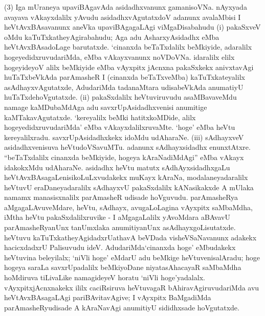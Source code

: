 (3) Iga mUraneya upaviBAgavAda asidadhxvanunx gamanisoVNa. nAyxyada avayava vAkayxdalilx yAvudu asidadhxvAgutatxdoV adanunx avalaMbisi I heVtAvxBAsa\-vanunx aneVka upaviBAgagaLAgi viMgaDisabahudu {\rm(i)} pakaSxveV oMdu kaTuTxkathe\-yAgira\-bahudu; Aga adu AsharxyAsidadhx eMba heVtAvxBAsadoLage barutatxde. `cinanxda beTaTx\-dalilx beMkiyide, adaralilx hogeyedidxruvudariMda, eMba vAkayxvanunx noVDoVNa. idaralilx elilx hogeyideyoV alilx beMkiyide eMba vAyxpitx jAcnxna pakaSxkekx anivxtavAgi huTaTxbeVkAda parAmasheR I (cinanxda beTaTxveMba) kaTuTxkateyalilx asAdhayxvAgutatxde, AdudariMda tadanaMtara udisabeVkAda anumatiyU huTaTxdehoVgutatxde. {\rm(ii)} pakaSx\-dalilx heVtuviruvudu asaMBavaveMdu namage kaMDubaMdAga adu savxrUpA\-sidadhxvenisi anu\-mitige kaMTakavAgutatxde. `kereyalilx beMki hatitxkoMDide, alilx hogeyedidxruvudariMda' eMba vAkayxdalilxruvaMte. `hoge' eMba heVtu kereyalilxradu. savxrUpA\-sidadhxkekx idoMdu udAharaNe. {\rm(iii)} sAdhayxveV asidadhxvenisuva heVtudoVSavuMTu. adanunx sAdhayx\-sidadhx enunxtAtxre. ``beTaTxdalilx cinanxda beMkiyide, hogeya kAraNadiMdAgi'' eMba vAkayx ida\-kokxMdu udAharaNe. asidadhx heVtu matutx sAdhAyxsidadhxgaLu heVtAvx\-BAsagaLenisikoLuLx\-vudakekx muKayx kAraNa, modalaneyadaralilx heVtuvU eraDaneyadaralilx sAdhayxvU pakaSx\-dalilx kANasikakxde A mUlaka namamx manasisxnalilx parAmasheR udisade hoVguvudu. parAmasheRya aMgagaLAvuveMdare, heVtu, sAdhayx, avugaLoLagina vAyxpitx saMbaMdha, iMtha heVtu pakaSxdalilxruvike - I aMgagaLalilx yAvoMdara aBAvavU parAmasheR\-yanUnx tanUmxlaka anumitiyanUnx asAdhayxgoLisutatxde. heVtuvu kaTuTxkatheyAgi\-dadxrU\break athavA beVDada visheVSaNavanunx adakekx hacicxdadxrU Palisuvudu ideV. AdudariMda\break `cinanxda hoge' eMbudakekx heVtuvina beleyilalx; `niVli hoge' eMdarU adu \hbox{beMkige} heVtuvenisalAradu; hoge hogeya saraLa savxrUpadalilx beMkiyoDane niyata\-sAha\-cayaR saMbaMdha hoMdiruva tiLivaLike namagideyeV horatu `niVli hoge'yadalalx. vAyxpitxjAcnxnakekx ililx caciRsiruva heVtuvagaR bAhiravAgiruvudariMda avu heVtAvxBAsa\-gaLAgi pariBAvitavAgive; I vAyxpitx BaMgadiMda parAmasheRyudisade A kAraNavAgi anumitiyU sididhxsade hoVgutatxde.

